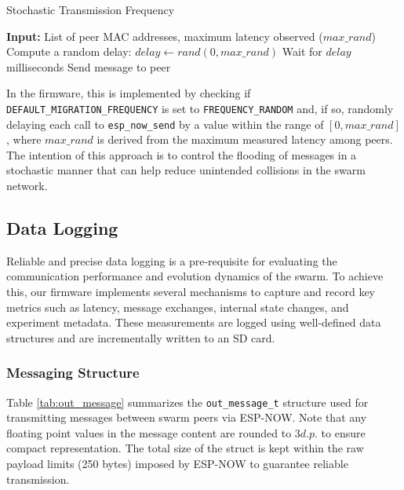 \documentclass[conference]{IEEEtran}
\begin{document}
\begin{algorithm}[H]
\caption{Stochastic Transmission Frequency}
\label{alg:transmission_freq}
\begin{algorithmic}[1]
\State \textbf{Input:} List of peer MAC addresses, maximum latency observed ($max\_rand$)
        \State Compute a random delay: $delay \gets rand(0, max\_rand)$
        \State Wait for $delay$ milliseconds
        \State Send message to peer
    \EndIf
\EndFor
\end{algorithmic}
\end{algorithm}

In the firmware, this is implemented by checking if \texttt{DEFAULT\_MIGRATION\_FREQUENCY} is set to \texttt{FREQUENCY\_RANDOM} and, if so, randomly delaying each call to \texttt{esp\_now\_send} by a value within the range of $[0, max\_rand]$, where $max\_rand$ is derived from the maximum measured latency among peers. The intention of this approach is to control the flooding of messages in a stochastic manner that can help reduce unintended collisions in the swarm network.

\subsection{Data Logging}\label{sec:data-logging}

Reliable and precise data logging is a pre-requisite for evaluating the communication performance and evolution dynamics of the swarm. To achieve this, our firmware implements several mechanisms to capture and record key metrics such as latency, message exchanges, internal state changes, and experiment metadata. These measurements are logged using well-defined data structures and are incrementally written to an SD card.\\

\subsubsection{Messaging Structure}

Table \ref{tab:out_message} summarizes the \texttt{out\_message\_t} structure used for transmitting messages between swarm peers via ESP-NOW. Note that any floating point values in the message content are rounded to $3 d.p.$ to ensure compact representation. The total size of the struct is kept within the raw payload limits (250 bytes) imposed by ESP-NOW to guarantee reliable transmission.
\end{document}
